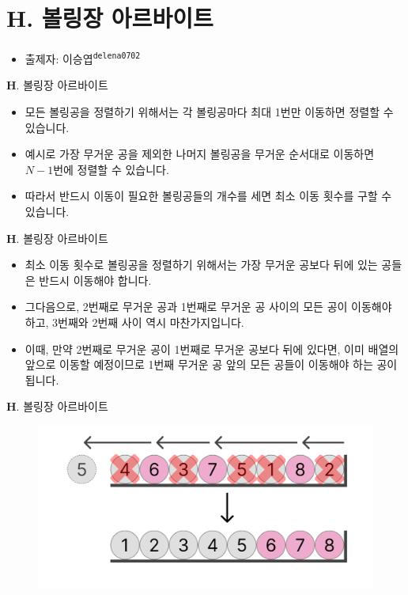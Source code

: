 \section{H. 볼링장 아르바이트}

\begin{frame} %
    \begin{itemize}
        \item 출제자: 이승엽\textsuperscript{\color{kupc-gray}\texttt{delena0702}}
    \end{itemize}
\end{frame}

\begin{frame}{\textbf{H}. 볼링장 아르바이트}
	\begin{itemize}
		\item 모든 볼링공을 정렬하기 위해서는 각 볼링공마다 최대 1번만 이동하면 정렬할 수 있습니다.
		\item 예시로 가장 무거운 공을 제외한 나머지 볼링공을 무거운 순서대로 이동하면 $N - 1$번에 정렬할 수 있습니다.
		\item 따라서 반드시 이동이 필요한 볼링공들의 개수를 세면 최소 이동 횟수를 구할 수 있습니다.
	\end{itemize}
\end{frame}

\begin{frame}{\textbf{H}. 볼링장 아르바이트}	
	\begin{itemize}
		\item 최소 이동 횟수로 볼링공을 정렬하기 위해서는 가장 무거운 공보다 뒤에 있는 공들은 반드시 이동해야 합니다.
		\item 그다음으로, 2번째로 무거운 공과 1번째로 무거운 공 사이의 모든 공이 이동해야 하고, 3번째와 2번째 사이 역시 마찬가지입니다.
		\item 이때, 만약 2번째로 무거운 공이 1번째로 무거운 공보다 뒤에 있다면, 이미 배열의 앞으로 이동할 예정이므로 1번째 무거운 공 앞의 모든 공들이 이동해야 하는 공이 됩니다.
	\end{itemize}
\end{frame}

\begin{frame}{\textbf{H}. 볼링장 아르바이트}	
	\begin{figure}[h!]
		\centering
		\includegraphics[width=0.9\linewidth]{../images/bowling-part-time/1.png}
	\end{figure}
\end{frame}

